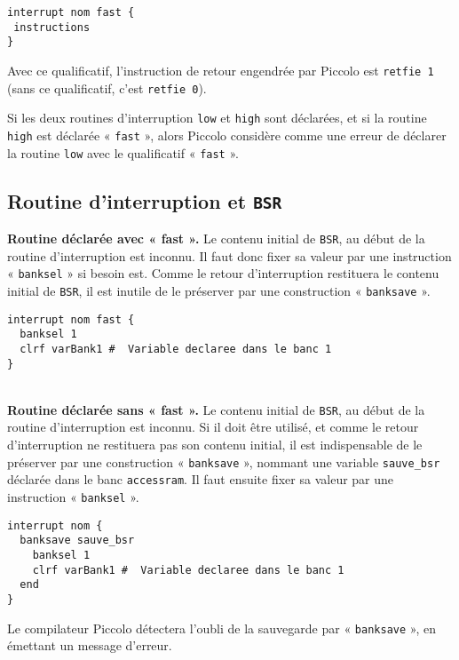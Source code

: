 \begin{lstlisting}[language=piccolo]
interrupt nom fast {
 instructions
}
\end{lstlisting}

Avec ce qualificatif, l’instruction de retour engendrée par Piccolo est \texttt{retfie 1} (sans ce qualificatif, c’est \texttt{retfie 0}).

Si les deux routines d’interruption \texttt{low} et \texttt{high} sont déclarées, et si la routine \texttt{high} est déclarée « \texttt{fast} », alors Piccolo considère comme une erreur de déclarer la routine \texttt{low} avec le qualificatif « \texttt{fast} ».






\subsection{Routine d'interruption et \texttt{BSR}}

\textbf{Routine déclarée avec « fast ».} Le contenu initial de \texttt{BSR}, au début de la routine d’interruption est inconnu. Il faut donc fixer sa valeur par une instruction « \texttt{banksel} » si besoin est. Comme le retour d’interruption restituera le contenu initial de \texttt{BSR}, il est inutile de le préserver par une construction « \texttt{banksave} ».

\begin{lstlisting}[language=piccolo]
interrupt nom fast {
  banksel 1
  clrf varBank1 #  Variable declaree dans le banc 1
}
\end{lstlisting}

~\\
\textbf{Routine déclarée sans « fast ».} Le contenu initial de \texttt{BSR}, au début de la routine d’interruption est inconnu. Si il doit être utilisé, et comme le retour d’interruption ne restituera pas son contenu initial, il est indispensable de le préserver par une construction « \texttt{banksave} », nommant une variable \texttt{sauve\_bsr} déclarée dans le banc \texttt{accessram}. Il faut ensuite fixer sa valeur par une instruction « \texttt{banksel} ». 

\begin{lstlisting}[language=piccolo]
interrupt nom {
  banksave sauve_bsr
    banksel 1
    clrf varBank1 #  Variable declaree dans le banc 1
  end
}
\end{lstlisting}

Le compilateur Piccolo détectera l’oubli de la sauvegarde par « \texttt{banksave} », en émettant un message d’erreur.


